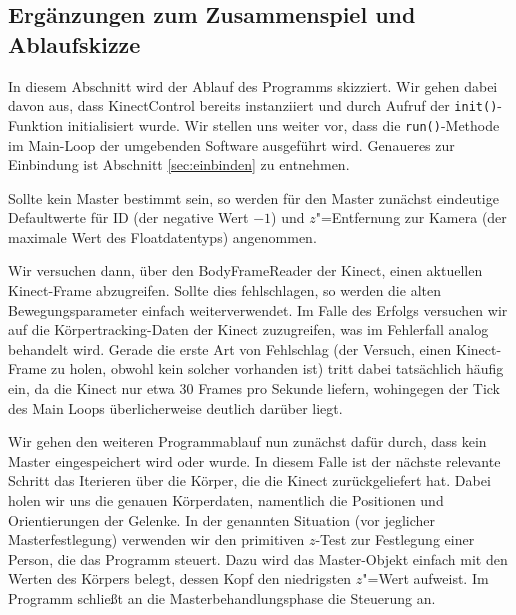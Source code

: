 \subsection{Ergänzungen zum Zusammenspiel und Ablaufskizze}
In diesem Abschnitt wird der Ablauf des Programms skizziert. Wir gehen dabei davon aus, dass KinectControl bereits instanziiert und durch Aufruf der \texttt{init()}-Funktion initialisiert wurde. Wir stellen uns weiter vor, dass die \texttt{run()}-Methode im Main-Loop der umgebenden Software ausgeführt wird. Genaueres zur Einbindung ist Abschnitt \ref{sec:einbinden} zu entnehmen.\par 
Sollte kein Master bestimmt sein, so werden für den Master zunächst eindeutige Defaultwerte für ID (der negative Wert $-1$) und $z$"=Entfernung zur Kamera (der maximale Wert des Floatdatentyps) angenommen.\par 
Wir versuchen dann, über den BodyFrameReader der Kinect, einen aktuellen Kinect-Frame abzugreifen. Sollte dies fehlschlagen, so werden die alten Bewegungsparameter einfach weiterverwendet. Im Falle des Erfolgs versuchen wir auf die Körpertracking-Daten der Kinect zuzugreifen, was im Fehlerfall analog behandelt wird. Gerade die erste Art von Fehlschlag (der Versuch, einen Kinect-Frame zu holen, obwohl kein solcher vorhanden ist) tritt dabei tatsächlich häufig ein, da die Kinect nur etwa 30 Frames pro Sekunde liefern, wohingegen der Tick des Main Loops überlicherweise deutlich darüber liegt.\par\medskip
Wir gehen den weiteren Programmablauf nun zunächst dafür durch, dass kein Master eingespeichert wird oder wurde. In diesem Falle ist der nächste relevante Schritt das Iterieren über die Körper, die die Kinect zurückgeliefert hat. Dabei holen wir uns die genauen Körperdaten, namentlich die Positionen und Orientierungen der Gelenke. In der genannten Situation (vor jeglicher Masterfestlegung) verwenden wir den primitiven $z$-Test zur Festlegung einer Person, die das Programm steuert. Dazu wird das Master-Objekt einfach mit den Werten des Körpers belegt, dessen Kopf den niedrigsten $z$"=Wert aufweist. Im Programm schließt an die Masterbehandlungsphase die Steuerung an.\par 
